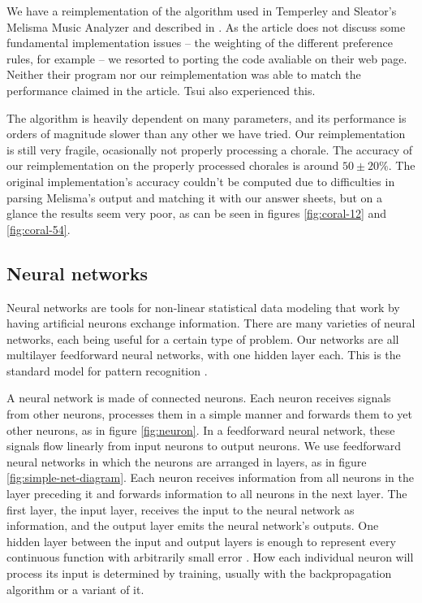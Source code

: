 \documentclass{article}
\begin{document}
We have a reimplementation of the algorithm used in Temperley and
Sleator's Melisma Music Analyzer and described in
\cite{temperley.ea:modeling}. As the article does not discuss some
fundamental implementation issues -- the weighting of the different
preference rules, for example -- we resorted to porting the code
avaliable on their web page. Neither their program nor our
reimplementation was able to match the performance claimed in the
article. Tsui \cite{tsui:harmonic} also experienced this.

The algorithm is heavily dependent on many parameters, and its
performance is orders of magnitude slower than any other we have
tried. Our reimplementation is still very fragile, ocasionally not
properly processing a chorale. The accuracy of our reimplementation on
the properly processed chorales is around $50 \pm 20\%$. The original
implementation's accuracy couldn't be computed due to difficulties in
parsing Melisma's output and matching it with our answer sheets, but on
a glance the results seem very poor, as can be seen in figures
\ref{fig:coral-12} and \ref{fig:coral-54}.

\subsection{Neural networks}
\label{sec:neural-nets}

Neural networks are tools for non-linear statistical data
modeling that work by having artificial neurons exchange
information. There are many varieties of neural networks, each being
useful for a certain type of problem. Our networks are all multilayer
feedforward neural networks, with one hidden layer each. This is the
standard model for pattern recognition \cite{russell.ea:artificial}.

A neural network is made of connected neurons. Each neuron receives
signals from other neurons, processes them in a simple manner and
forwards them to yet other neurons, as in figure \ref{fig:neuron}. In
a feedforward neural network, these signals flow linearly from input
neurons to output neurons. We use feedforward neural networks in which
the neurons are arranged in layers, as in figure
\ref{fig:simple-net-diagram}. Each neuron receives information from
all neurons in the layer preceding it and forwards information to all
neurons in the next layer. The first layer, the input layer, receives
the input to the neural network as information, and the output layer
emits the neural network's outputs. One hidden layer between the input
and output layers is enough to represent every continuous function
with arbitrarily small error \cite{russell.ea:artificial}. How each
individual neuron will process its input is determined by training,
usually with the backpropagation algorithm or a variant of it.
\end{document}
